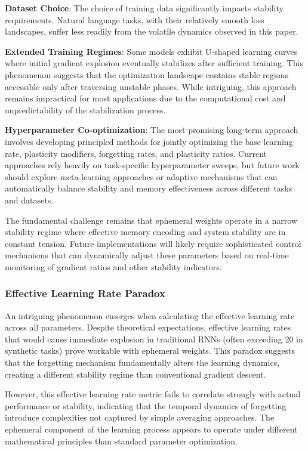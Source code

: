 \textbf{Dataset Choice}: The choice of training data significantly impacts stability requirements. Natural language tasks, with their relatively smooth loss landscapes, suffer less readily from the volatile dynamics observed in this paper. 

\textbf{Extended Training Regimes}: Some models exhibit U-shaped learning curves where initial gradient explosion eventually stabilizes after sufficient training. This phenomenon suggests that the optimization landscape contains stable regions accessible only after traversing unstable phases. While intriguing, this approach remains impractical for most applications due to the computational cost and unpredictability of the stabilization process.

\textbf{Hyperparameter Co-optimization}: The most promising long-term approach involves developing principled methods for jointly optimizing the base learning rate, plasticity modifiers, forgetting rates, and plasticity ratios. Current approaches rely heavily on task-specific hyperparameter sweeps, but future work should explore meta-learning approaches or adaptive mechanisms that can automatically balance stability and memory effectiveness across different tasks and datasets.

The fundamental challenge remains that ephemeral weights operate in a narrow stability regime where effective memory encoding and system stability are in constant tension. Future implementations will likely require sophisticated control mechanisms that can dynamically adjust these parameters based on real-time monitoring of gradient ratios and other stability indicators.

\subsubsection{Effective Learning Rate Paradox}

An intriguing phenomenon emerges when calculating the effective learning rate across all parameters. Despite theoretical expectations, effective learning rates that would cause immediate explosion in traditional RNNs (often exceeding 20 in synthetic tasks) prove workable with ephemeral weights. This paradox suggests that the forgetting mechanism fundamentally alters the learning dynamics, creating a different stability regime than conventional gradient descent.

However, this effective learning rate metric fails to correlate strongly with actual performance or stability, indicating that the temporal dynamics of forgetting introduce complexities not captured by simple averaging approaches. The ephemeral component of the learning process appears to operate under different mathematical principles than standard parameter optimization.

